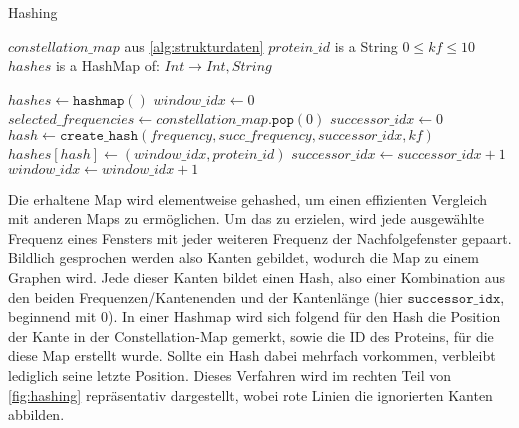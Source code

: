         \begin{algorithm}[H]
            \caption{Hashing}\label{alg:hashing}
            \begin{algorithmic}
                \Require $constellation\_map$ aus \autoref{alg:strukturdaten}
                \Require $protein\_id$ is a String
                \Require $0 \leq kf \leq 10$
                \Ensure $hashes$ is a HashMap of: $Int \rightarrow Int, String$

                \State $hashes \gets \texttt{hashmap}()$
                \State $window\_idx \gets 0$
                \Repeat
                    \State $selected\_frequencies \gets constellation\_map.\texttt{pop}(0)$
                        \State $successor\_idx \gets 0$
                                \State $hash \gets \texttt{create\_hash}(frequency, succ\_frequency, successor\_idx, kf)$
                                \State $hashes[hash] \gets (window\_idx, protein\_id)$
                            \EndFor
                        \EndFor
                        \State $successor\_idx \gets successor\_idx + 1$
                    \EndFor
                    \State $window\_idx \gets window\_idx + 1$
            \end{algorithmic}
        \end{algorithm}

        Die erhaltene Map wird elementweise gehashed, um einen effizienten Vergleich mit anderen Maps zu ermöglichen. Um das zu erzielen, wird jede ausgewählte Frequenz eines Fensters mit jeder weiteren Frequenz der Nachfolgefenster gepaart. Bildlich gesprochen werden also Kanten gebildet, wodurch die Map zu einem Graphen wird. Jede dieser Kanten bildet einen Hash, also einer Kombination aus den beiden Frequenzen/Kantenenden und der Kantenlänge (hier $\texttt{successor\_idx}$, beginnend mit 0). In einer Hashmap wird sich folgend für den Hash die Position der Kante in der Constellation-Map gemerkt, sowie die ID des Proteins, für die diese Map erstellt wurde. Sollte ein Hash dabei mehrfach vorkommen, verbleibt lediglich seine letzte Position. Dieses Verfahren wird im rechten Teil von \autoref{fig:hashing} repräsentativ dargestellt, wobei rote Linien die ignorierten Kanten abbilden.

